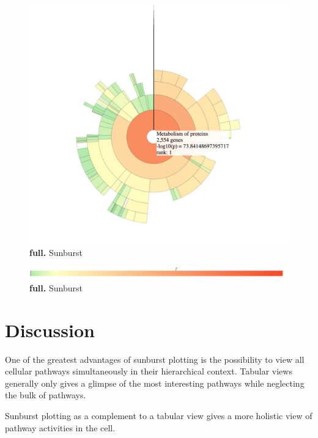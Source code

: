 \documentclass[11pt]{article}
\begin{document}
\begin{figure}[htp]
\begin{center}
\includegraphics[width=0.96\linewidth,clip]{./img/mop_specific.png}
\caption{\label{fig:mop_specific} {\bf full.} Sunburst}
\end{center}
\end{figure}

\begin{figure}[htp]
\begin{center}
\includegraphics[width=0.96\linewidth,clip]{./img/color_scale.png}
\caption{\label{fig:color_scale} {\bf full.} Sunburst}
\end{center}
\end{figure}

\section*{Discussion}
  One of the greatest advantages of sunburst plotting is the possibility to view all cellular pathways simultaneously in their hierarchical context. Tabular views generally only gives a glimpse of the most interesting pathways while neglecting the bulk of pathways.

  Sunburst plotting as a complement to a tabular view gives a more holistic view of pathway activities in the cell.
\end{document}
